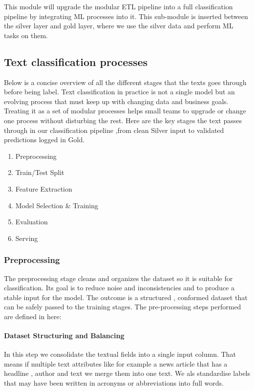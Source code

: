 This module will upgrade the modular ETL pipeline into a full classification pipeline by integrating  ML processes into it. This sub-module is inserted between the silver layer and gold layer, where we use the silver data and perform ML tasks on them.


\subsection{Text classification processes}
Below is a concise overview of all the different stages that the texts goes through before being label. Text classification in practice is not a single model but an evolving process that must keep up with changing data and business goals. Treating it as a set of modular processes helps small teams to upgrade or change one process without disturbing the rest. Here are the key stages the text passes through in our classification pipeline \cite{daud:2023},from clean Silver input to validated predictions logged in Gold.

\begin{enumerate}
  \item Preprocessing
  \item Train/Test Split
  \item Feature Extraction
  \item Model Selection \& Training
  \item Evaluation
  \item Serving
\end{enumerate}

\subsubsection{Preprocessing}
The preprocessing stage cleans and organizes the dataset so it is suitable for classification. Its goal is to reduce noise and inconsistencies and to produce a stable input for the model. The outcome is a structured , conformed dataset that can be safely passed to the training stages. The pre-processing steps performed are defined in here:

\paragraph{Dataset Structuring and Balancing}

\smallskip
In this step we consolidate the textual fields into a single input column. That means if multiple text attributes like for example a news article that has a headline , author and text we merge them into one text. We als standardise labels that may have been written in acronyms or abbreviations into full words.
\smallskip

